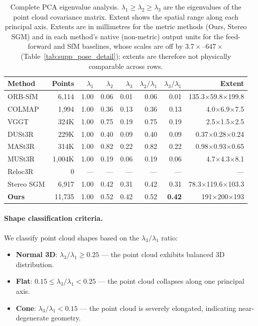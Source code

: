 \documentclass[review]{elsarticle}
\begin{document}
\begin{table}[h]
\centering
\caption{Complete PCA eigenvalue analysis. $\lambda_1 \geq \lambda_2 \geq \lambda_3$ are the eigenvalues of the point cloud covariance matrix. Extent shows the spatial range along each principal axis. Extents are in millimetres for the metric methods (Ours, Stereo SGM) and in each method's native (non-metric) output units for the feed-forward and SfM baselines, whose scales are off by $3.7{\times}$--$647{\times}$ (Table~\ref{tab:supp_pose_detail}); extents are therefore not physically comparable across rows.}
\label{tab:supp_pca_detail}
\setlength{\tabcolsep}{4pt}
\renewcommand{\arraystretch}{1.05}
\begin{tabular}{lrrrrrrr}
\toprule
Method & Points & $\lambda_1$ & $\lambda_2$ & $\lambda_3$ & $\lambda_2/\lambda_1$ & $\lambda_3/\lambda_1$ & Extent \\
\midrule
ORB-SfM & 6{,}114 & 1.00 & 0.06 & 0.01 & 0.06 & 0.01 & 135.3$\times$59.8$\times$199.8 \\
COLMAP & 1{,}994 & 1.00 & 0.36 & 0.13 & 0.36 & 0.13 & 4.0$\times$6.9$\times$7.5 \\
VGGT & 324K & 1.00 & 0.75 & 0.19 & 0.75 & 0.19 & 2.5$\times$1.5$\times$2.5 \\
DUSt3R & 229K & 1.00 & 0.40 & 0.09 & 0.40 & 0.09 & 0.37$\times$0.28$\times$0.24 \\
MASt3R & 314K & 1.00 & 0.82 & 0.22 & 0.82 & 0.22 & 0.98$\times$0.93$\times$0.65 \\
MUSt3R & 1{,}004K & 1.00 & 0.19 & 0.06 & 0.19 & 0.06 & 4.7$\times$4.3$\times$8.1 \\
Reloc3R & 0 & --- & --- & --- & --- & --- & --- \\
\midrule
Stereo SGM & 6{,}917 & 1.00 & 0.42 & 0.31 & 0.42 & 0.31 & 78.3$\times$119.6$\times$103.3 \\
\textbf{Ours} & 11{,}735 & 1.00 & 0.52 & 0.42 & 0.52 & \textbf{0.42} & 191$\times$200$\times$193 \\
\bottomrule
\end{tabular}
\end{table}

\paragraph{Shape classification criteria.}
We classify point cloud shapes based on the $\lambda_3/\lambda_1$ ratio:
\begin{itemize}[noitemsep]
    \item \textbf{Normal 3D}: $\lambda_3/\lambda_1 \geq 0.25$ --- the point cloud exhibits balanced 3D distribution.
    \item \textbf{Flat}: $0.15 \leq \lambda_3/\lambda_1 < 0.25$ --- the point cloud collapses along one principal axis.
    \item \textbf{Cone}: $\lambda_3/\lambda_1 < 0.15$ --- the point cloud is severely elongated, indicating near-degenerate geometry.
\end{itemize}
\end{document}
